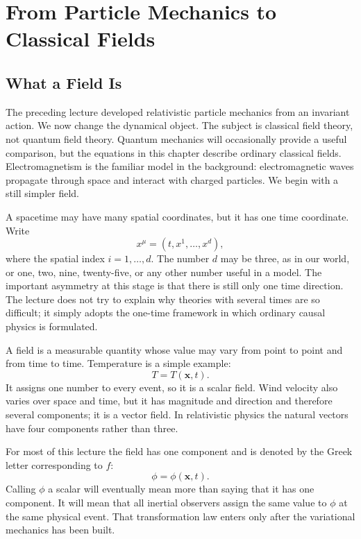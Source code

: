 \chapter{From Particle Mechanics to Classical Fields}

\section{What a Field Is}

The preceding lecture developed relativistic particle mechanics from an invariant
action.  We now change the dynamical object.  The subject is classical field
theory, not quantum field theory.  Quantum mechanics will occasionally provide
a useful comparison, but the equations in this chapter describe ordinary
classical fields.  Electromagnetism is the familiar model in the background:
electromagnetic waves propagate through space and interact with charged
particles.  We begin with a still simpler field.

A spacetime may have many spatial coordinates, but it has one time coordinate.
Write
\begin{equation}
x^\mu=(t,x^1,\ldots,x^d),
\end{equation}
where the spatial index \(i=1,\ldots,d\).  The number \(d\) may be three, as in
our world, or one, two, nine, twenty-five, or any other number useful in a
model.  The important asymmetry at this stage is that there is still only one
time direction.  The lecture does not try to explain why theories with several
times are so difficult; it simply adopts the one-time framework in which
ordinary causal physics is formulated.

A field is a measurable quantity whose value may vary from point to point and
from time to time.  Temperature is a simple example:
\begin{equation}
T=T(\mathbf{x},t).
\end{equation}
It assigns one number to every event, so it is a scalar field.  Wind velocity
also varies over space and time, but it has magnitude and direction and
therefore several components; it is a vector field.  In relativistic physics
the natural vectors have four components rather than three.

For most of this lecture the field has one component and is denoted by the
Greek letter corresponding to \(f\):
\begin{equation}
\phi=\phi(\mathbf{x},t).
\label{eq:sr4-field-definition}
\end{equation}
Calling \(\phi\) a scalar will eventually mean more than saying that it has one
component.  It will mean that all inertial observers assign the same value to
\(\phi\) at the same physical event.  That transformation law enters only
after the variational mechanics has been built.

